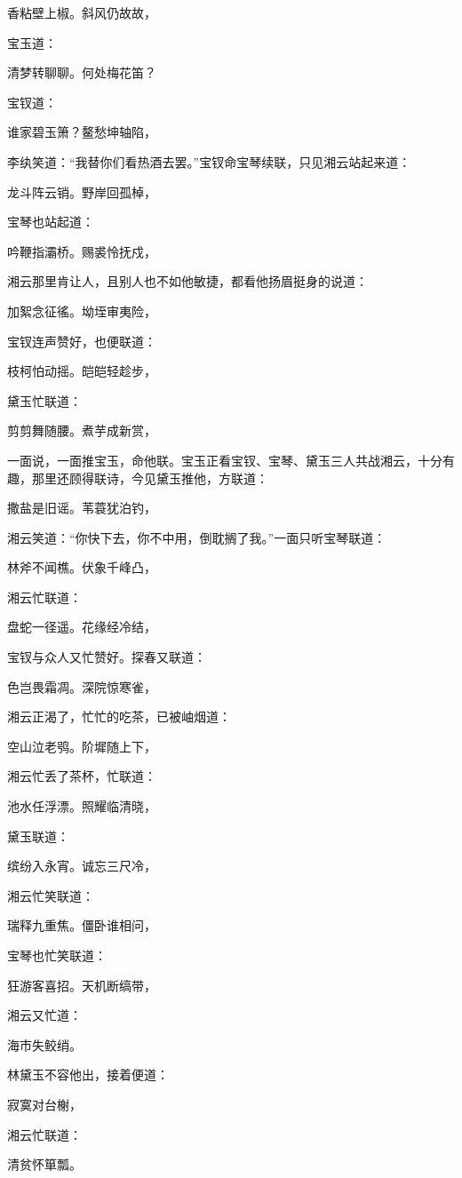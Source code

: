 香粘壁上椒。斜风仍故故，

宝玉道：

清梦转聊聊。何处梅花笛？

宝钗道：

谁家碧玉箫？鳌愁坤轴陷，

李纨笑道：``我替你们看热酒去罢。''宝钗命宝琴续联，只见湘云站起来道：

龙斗阵云销。野岸回孤棹，

宝琴也站起道：

吟鞭指灞桥。赐裘怜抚戍，

湘云那里肯让人，且别人也不如他敏捷，都看他扬眉挺身的说道：

加絮念征徭。坳垤审夷险，

宝钗连声赞好，也便联道：

枝柯怕动摇。皑皑轻趁步，

黛玉忙联道：

剪剪舞随腰。煮芋成新赏，

一面说，一面推宝玉，命他联。宝玉正看宝钗、宝琴、黛玉三人共战湘云，十分有趣，那里还顾得联诗，今见黛玉推他，方联道：

撒盐是旧谣。苇蓑犹泊钓，

湘云笑道：``你快下去，你不中用，倒耽搁了我。''一面只听宝琴联道：

林斧不闻樵。伏象千峰凸，

湘云忙联道：

盘蛇一径遥。花缘经冷结，

宝钗与众人又忙赞好。探春又联道：

色岂畏霜凋。深院惊寒雀，

湘云正渴了，忙忙的吃茶，已被岫烟道：

空山泣老鸮。阶墀随上下，

湘云忙丢了茶杯，忙联道：

池水任浮漂。照耀临清晓，

黛玉联道：

缤纷入永宵。诚忘三尺冷，

湘云忙笑联道：

瑞释九重焦。僵卧谁相问，

宝琴也忙笑联道：

狂游客喜招。天机断缟带，

湘云又忙道：

海市失鲛绡。

林黛玉不容他出，接着便道：

寂寞对台榭，

湘云忙联道：

清贫怀箪瓢。

